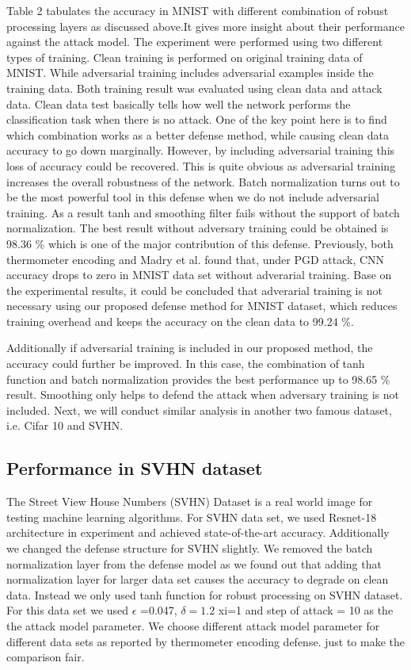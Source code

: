\documentclass[conference]{IEEEtran}
\begin{document}
Table 2 tabulates the accuracy in MNIST with different combination of robust processing layers as discussed above.It gives more insight about their performance against the attack model. The experiment were performed using two different types of training. Clean training  is performed on original training data of MNIST. While adversarial training includes adversarial examples inside the training data. Both training result was evaluated using clean data and attack data. Clean data test basically tells how well the network performs the classification task when there is no attack. One of the key point here is to find which combination works as a better defense method, while causing clean data accuracy to go down marginally. However, by including adversarial training this loss of accuracy could be recovered. This is quite obvious as adversarial training increases the overall robustness of the network. Batch normalization turns out to be the most powerful tool in this defense when we do not include adversarial training. As a result tanh and smoothing filter fails without the support of batch normalization. The best result without adversary training could be obtained is 98.36 \% which is one of the major contribution of this defense. Previously, both thermometer encoding and Madry et al. found that, under PGD attack, CNN accuracy drops to zero in MNIST data set without adverarial training. Base on the experimental results, it could be concluded that adverarial training is not necessary using our proposed defense method for MNIST dataset, which reduces training overhead and keeps the accuracy on the clean data to 99.24 \%.

Additionally if adversarial training is included in our proposed method, the accuracy could further be improved. In this case, the combination of tanh function and batch normalization provides the best performance up to 98.65 \% result. Smoothing only helps to defend the attack when adversary training is not included. Next, we will conduct similar analysis in another two famous dataset, i.e. Cifar 10 and SVHN. 

\subsection{Performance in SVHN dataset}
The Street View House Numbers (SVHN) Dataset is a real world image for testing machine learning algorithms. For SVHN data set, we used Resnet-18 architecture \cite{he2016deep} in experiment and achieved state-of-the-art accuracy. Additionally we changed the defense structure for SVHN slightly. We removed the batch normalization layer from the defense model as we found out that adding that normalization layer for larger data set causes the accuracy to degrade on clean data. Instead we only used tanh function for robust processing on SVHN dataset. For this data set we used $\epsilon$ =0.047, $\delta=1.2$ xi=1 and step of attack = 10 as the the attack model parameter. We choose different attack model parameter for different data sets as reported by thermometer encoding defense. \cite{anonymous2018thermometer} just to make the comparison fair.
\end{document}
